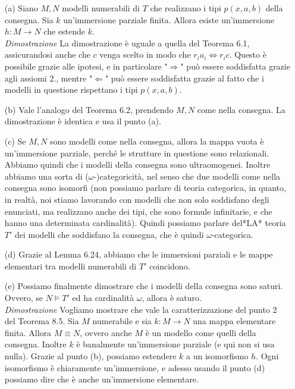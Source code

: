 \documentclass[10pt,a4paper]{article}
\def\models{\vDash}
\begin{document}
\begin{itemize}
\item[(a)]  Siano $M,N$ modelli numerabili di $T$ che realizzano i tipi $p(x,a,b)$ della consegna. Sia $k$ un'immersione parziale finita. Allora esiste un'immersione $h: M \rightarrow N$ che estende $k$.\\
\textit{Dimostrazione} La dimostrazione è uguale a quella del Teorema 6.1, assicurandosi anche che $c$ venga scelto in modo che $r_i a_i \Leftrightarrow r_i c$. Questo è possibile grazie alle ipotesi, e in particolare "$\Rightarrow$" può essere soddisfatta grazie agli assiomi 2., mentre "$\Leftarrow$" può essere soddisfatta grazie al fatto che i modelli in questione rispettano i tipi $p(x,a,b)$.
\item[(b)] Vale l'analogo del Teorema 6.2, prendendo $M,N$ come nella consegna. La dimostrazione è identica e usa il punto (a).
\item[(c)] Se $M,N$ sono modelli come nella consegna, allora la mappa vuota è un'immersione parziale, perché le strutture in questione sono relazionali. Abbiamo quindi che i modelli della consegna sono ultraomogenei. Inoltre abbiamo una sorta di ($\omega$-)categoricità, nel senso che due modelli come nella consegna sono isomorfi (non possiamo parlare di teoria categorica, in quanto, in realtà, noi stiamo lavorando con modelli che non solo soddisfano degli enunciati, ma realizzano anche dei tipi, che sono formule infinitarie, e che hanno una determinata cardinalità). Quindi possiamo parlare del*LA* teoria $T'$ dei modelli che soddisfano la consegna, che è quindi $\omega$-categorica.
\item[(d)] Grazie al Lemma 6.24, abbiamo che le immersioni parziali e le mappe elementari tra modelli numerabili di $T'$ coincidono.
\item[(e)] Possiamo finalmente dimostrare che i modelli della consegna sono saturi. Ovvero, se $N \models T'$ ed ha cardinalità $\omega$, allora è saturo.\\
\textit{Dimostrazione} Vogliamo mostrare che vale la caratterizzazione del punto 2 del Teorema 8.5. Sia $M$ numerabile e sia $k: M \rightarrow N$ una mappa elementare finita. Allora $M \equiv N$, ovvero anche $M$ è un modello come quelli della consegna. Inoltre $k$ è banalmente un'immersione parziale (e qui non si usa nulla). Grazie al punto (b), possiamo estendere $k$ a un isomorfismo $h$. Ogni isomorfismo è chiaramente un'immersione, e adesso usando il punto (d) possiamo dire che è anche un'immersione elementare.
\end{itemize}
\end{document}
